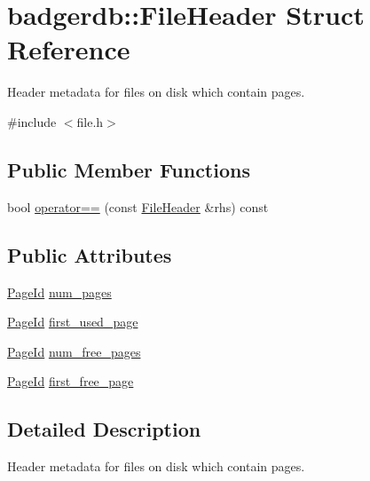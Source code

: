 \hypertarget{structbadgerdb_1_1FileHeader}{\section{badgerdb\-:\-:File\-Header Struct Reference}
\label{structbadgerdb_1_1FileHeader}
}


Header metadata for files on disk which contain pages.  




{\ttfamily \#include $<$file.\-h$>$}

\subsection*{Public Member Functions}
\begin{DoxyCompactItemize}
\item 
bool \hyperlink{structbadgerdb_1_1FileHeader_ae6439483acdb0eee52654c9c401793ca}{operator==} (const \hyperlink{structbadgerdb_1_1FileHeader}{File\-Header} \&rhs) const 
\end{DoxyCompactItemize}
\subsection*{Public Attributes}
\begin{DoxyCompactItemize}
\item 
\hyperlink{namespacebadgerdb_a1f49e404293bf4240756b89b53b1587a}{Page\-Id} \hyperlink{structbadgerdb_1_1FileHeader_aa1cfc5220c6795868c8301cec298c8a6}{num\-\_\-pages}
\item 
\hyperlink{namespacebadgerdb_a1f49e404293bf4240756b89b53b1587a}{Page\-Id} \hyperlink{structbadgerdb_1_1FileHeader_ad006b5b9d02b8c20e7ad5226680779c6}{first\-\_\-used\-\_\-page}
\item 
\hyperlink{namespacebadgerdb_a1f49e404293bf4240756b89b53b1587a}{Page\-Id} \hyperlink{structbadgerdb_1_1FileHeader_a07ac20f98d6aced3eb5358e0d4830abc}{num\-\_\-free\-\_\-pages}
\item 
\hyperlink{namespacebadgerdb_a1f49e404293bf4240756b89b53b1587a}{Page\-Id} \hyperlink{structbadgerdb_1_1FileHeader_aa86917d8554a42318c795471f32ad006}{first\-\_\-free\-\_\-page}
\end{DoxyCompactItemize}


\subsection{Detailed Description}
Header metadata for files on disk which contain pages. 

